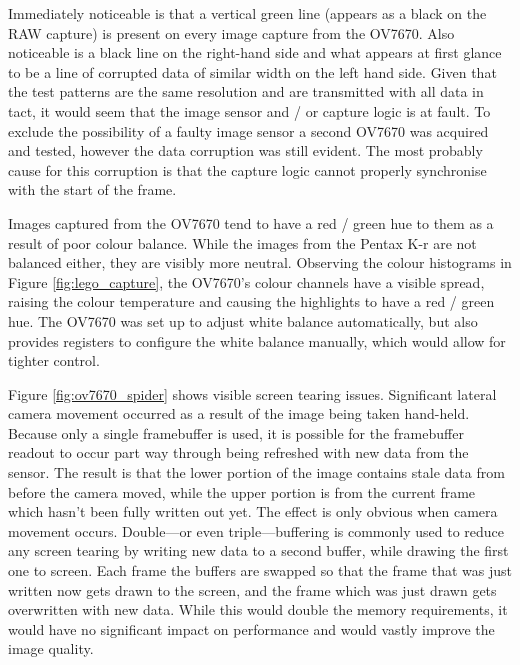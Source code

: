 Immediately noticeable is that a vertical green line (appears as a black on the RAW capture) is present on every image capture from the OV7670. Also noticeable is a black line on the right-hand side and what appears at first glance to be a line of corrupted data of similar width on the left hand side. Given that the test patterns are the same resolution and are transmitted with all data in tact, it would seem that the image sensor and / or capture logic is at fault. To exclude the possibility of a faulty image sensor a second OV7670 was acquired and tested, however the data corruption was still evident. The most probably cause for this corruption is that the capture logic cannot properly synchronise with the start of the frame.

Images captured from the OV7670 tend to have a red / green hue to them as a result of poor colour balance. While the images from the Pentax K-r are not balanced either, they are visibly more neutral. Observing the colour histograms in Figure \ref{fig:lego_capture}, the OV7670's colour channels have a visible spread, raising the colour temperature and causing the highlights to have a red / green hue. The OV7670 was set up to adjust white balance automatically, but also provides registers to configure the white balance manually, which would allow for tighter control.

Figure \ref{fig:ov7670_spider} shows visible screen tearing issues. Significant lateral camera movement occurred as a result of the image being taken hand-held. Because only a single framebuffer is used, it is possible for the framebuffer readout to occur part way through being refreshed with new data from the sensor. The result is that the lower portion of the image contains stale data from before the camera moved, while the upper portion is from the current frame which hasn't been fully written out yet. The effect is only obvious when camera movement occurs. Double---or even triple---buffering is commonly used to reduce any screen tearing by writing new data to a second buffer, while drawing the first one to screen. Each frame the buffers are swapped so that the frame that was just written now gets drawn to the screen, and the frame which was just drawn gets overwritten with new data. While this would double the memory requirements, it would have no significant impact on performance and would vastly improve the image quality.

